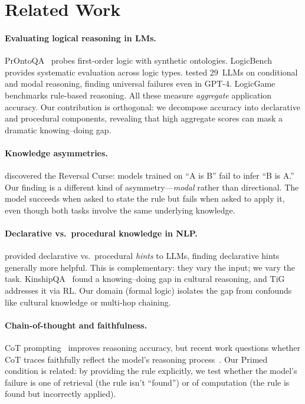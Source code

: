 \documentclass{article}
\begin{document}
\section{Related Work}
\label{sec:related}

\paragraph{Evaluating logical reasoning in LMs.}
PrOntoQA~\cite{saparov2023prontoqa} probes first-order logic with
synthetic ontologies.
LogicBench~\cite{xu2024logicbench} provides systematic evaluation
across logic types.
\citet{hopp2024conditional} tested 29~LLMs on conditional and modal
reasoning, finding universal failures even in GPT-4.
LogicGame~\cite{wan2024logicgame} benchmarks rule-based reasoning.
All these measure \emph{aggregate} application accuracy.
Our contribution is orthogonal: we decompose accuracy into
declarative and procedural components, revealing that high aggregate
scores can mask a dramatic knowing--doing gap.

\paragraph{Knowledge asymmetries.}
\citet{berglund2024reversal} discovered the Reversal Curse: models
trained on ``A is B'' fail to infer ``B is A.''
Our finding is a different kind of asymmetry---\emph{modal} rather
than directional.
The model succeeds when asked to state the rule but fails when asked
to apply it, even though both tasks involve the same underlying
knowledge.

\paragraph{Declarative vs.\ procedural knowledge in NLP.}
\citet{li2024metacognitive} provided declarative vs.\ procedural
\emph{hints} to LLMs, finding declarative hints generally more
helpful.
This is complementary: they vary the input; we vary the task.
KinshipQA~\cite{kinshipqa2026} found a knowing--doing gap in
cultural reasoning, and TiG~\cite{liao2025tig} addresses it via RL.
Our domain (formal logic) isolates the gap from confounds like
cultural knowledge or multi-hop chaining.

\paragraph{Chain-of-thought and faithfulness.}
CoT prompting~\cite{wei2022cot} improves reasoning accuracy, but
recent work questions whether CoT traces faithfully reflect the
model's reasoning process~\cite{turpin2024unfaithful,lanham2023measuring}.
Our Primed condition is related: by providing the rule explicitly,
we test whether the model's failure is one of retrieval (the rule
isn't ``found'') or of computation (the rule is found but
incorrectly applied).
\end{document}
